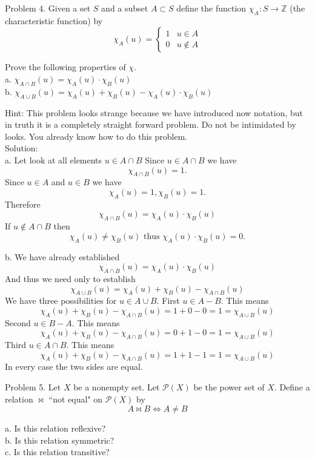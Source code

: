 \documentclass[16 pt]{amsart}
\theoremstyle{definition}
\theoremstyle{remark}
\numberwithin{equation}{subsection}
\newcommand{\Z}{\mathbb{Z}}
\begin{document}
\newpage
Problem 4.
Given a set $S$ and a subset $A\subset S$ define the function $\chi_A : S\rightarrow \Z$ (the characteristic function) by 
\[
\chi_A (u) = \left\{ \begin{array}{cc}
1 & u\in A \\ 0 & u\notin A
\end{array}\right.
\]

Prove the following properties of $\chi$.\\
a. $\chi_{A\cap B}(u) = \chi_{A}(u)\cdot \chi_{B}(u)$\\
b. $\chi_{A\cup B}(u) = \chi_A(u)+\chi_B(u)-\chi_{A}(u)\cdot \chi_{B}(u)$

\vspace{1in}

Hint: This problem looks strange because we have introduced now notation, but in truth it is a completely straight forward problem.  Do not be intimidated by looks.  You already know how to do this problem.\\


Solution:\\
a.  Let look at all elements $u\in A\cap B$  Since $u\in A\cap B$ we have
\[
\chi_{A\cap B}(u)=1.
\]
Since $u\in A$ and $u\in B$ we have
\[
\chi_A(u)=1, \chi_B(u)=1.
\]
Therefore 
\[
\chi_{A\cap B}(u) = \chi_A(u)\cdot \chi_B(u)
\]
If $u\notin A\cap B$ then 
\[
\chi_A(u) \neq \chi_B(u) \text{ thus } \chi_A(u)\cdot \chi_B(u) = 0.
\]

b. We have already established
\[
\chi_{A\cap B}(u) = \chi_A(u)\cdot \chi_B(u)
\]
And thus we need only to establish
\[
\chi_{A\cup B}(u) = \chi_A(u)+ \chi_B(u) - \chi_{A\cap B}(u)
\]
We have three possibilities for $u\in A\cup B$.  First $u\in A-B$.
This means
\[
\chi_A(u)+ \chi_B(u) - \chi_{A\cap B}(u) = 1+ 0 - 0 = 1 = \chi_{A\cup B}(u)
\]
Second $u \in B-A$.
This means
\[
\chi_A(u)+ \chi_B(u) - \chi_{A\cap B}(u) = 0 + 1 - 0 = 1 = \chi_{A\cup B}(u)
\]
Third $u\in A\cap B$. This means
\[
\chi_A(u)+ \chi_B(u) - \chi_{A\cap B}(u) = 1+ 1 - 1 = 1 = \chi_{A\cup B}(u)
\]
In every case the two sides are equal.

\newpage 
Problem 5. Let $X$ be a nonempty set.  Let $\mathcal{P}(X)$ be the power set of $X$.  Define a relation $\bowtie$ ``not equal" on $\mathcal{P}(X)$ by
\[
A \bowtie B \Longleftrightarrow A \neq B
\]

a. Is this relation reflexive?\\
b. Is this relation symmetric?\\
c. Is this relation transitive?\\
\end{document}

